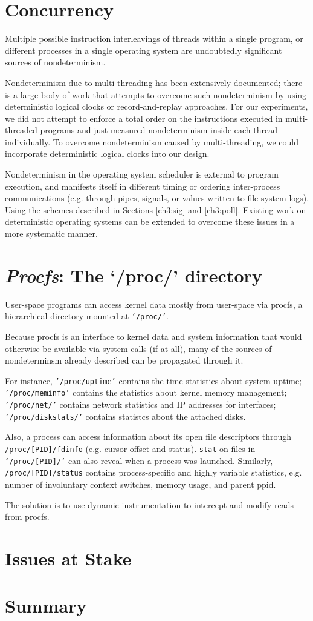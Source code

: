 \section{Concurrency}
Multiple possible instruction interleavings of 
threads within a single program, 
or different processes in 
a single operating system are
undoubtedly significant sources
of nondeterminism.

Nondeterminism due to multi-threading
has been extensively documented; there
is a large body of work that
attempts to overcome such nondeterminism
by using deterministic logical clocks
or record-and-replay approaches. 
For our experiments, we did not attempt to enforce
a total order on the instructions executed in multi-threaded
programs and just measured nondeterminism inside each
thread individually. To
overcome nondeterminism caused
by multi-threading, we could incorporate
deterministic logical clocks 
into our design.

Nondeterminism in the operating system
scheduler is external to 
program execution, and manifests itself
in different timing or ordering
inter-process communications (e.g.
through pipes, signals, or 
values written to file system logs).
Using the schemes described
in Sections \ref{ch3:sig} and 
\ref{ch3:poll}. Existing
work on deterministic
operating systems can
be extended to overcome these issues
in a more systematic manner.

\section{{\em Procfs}: The `/proc/' directory}\label{ch3:procfs}
User-space programs
can access kernel data mostly
from user-space via procfs,
a hierarchical directory mounted
at \texttt{`/proc/'}.

Because procfs is an interface
to kernel data and system information
that would otherwise be available
via system calls (if at all),
many of the sources of nondeterminsm
already described can be propagated
through it.

For instance, \texttt{'/proc/uptime'}
contains the time statistics
about system uptime;
\texttt{'/proc/meminfo'}
contains the statistics
about kernel memory management;
\texttt{'/proc/net/'}
contains network statistics
and IP addresses for interfaces;
\texttt{'/proc/diskstats/'}
contains statistcs about the
attached disks.

Also, a process can access 
information about its open file descriptors through
\texttt{/proc/[PID]/fdinfo} (e.g. cursor offset and status).
\texttt{stat} on files in \texttt{`/proc/[PID]/'}
can also reveal when a process was launched.
Similarly, \texttt{/proc/[PID]/status} contains
process-specific and highly variable statistics,
e.g. number of involuntary context switches,
memory usage, and parent ppid.

The solution is to use dynamic instrumentation
to intercept and modify reads 
from procfs.

\section{Issues at Stake}
\section {Summary}
